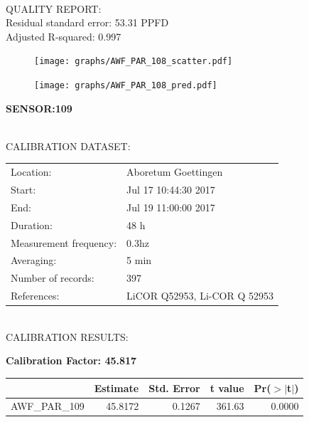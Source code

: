 \documentclass[oneside]{report}
\begin{document}
\hrulefill\\
QUALITY REPORT:\\
Residual standard error: 53.31 PPFD\\
Adjusted R-squared: 0.997



\begin{figure}[H]
  \centering
  \texttt{[image: graphs/AWF\_PAR\_108\_scatter.pdf]}
\end{figure}




\begin{figure}[H]
  \centering
  \texttt{[image: graphs/AWF\_PAR\_108\_pred.pdf]}
\end{figure}

\pagebreak


\begin{center}
\large{\textbf{SENSOR:109}}\\
\end{center}

\hrulefill\\
CALIBRATION DATASET:\\
\begin{table}[h!]
  \centering
  \label{tab:table1}
  \begin{tabular}{ll}
    Location: & Aboretum Goettingen\\ 
    
    
    Start:  & Jul 17 10:44:30 2017 \\
    End:   & Jul 19 11:00:00 2017\\ 
    Duration: & 48 h\\
    Measurement frequency: & 0.3hz\\
    Averaging:  &5 min\\
    Number of records: & 397 \\
    References: & LiCOR Q52953, Li-COR Q 52953 \\
  \end{tabular}
\end{table}

\hrulefill\\
CALIBRATION RESULTS:\\


\begin{center}
\textbf{\large{Calibration Factor: 45.817}}\\
\end{center}
\begin{table}[ht]
\centering
\begin{tabular}{rrrrr}
  \hline
 & Estimate & Std. Error & t value & Pr($>$$|$t$|$) \\ 
  \hline
AWF\_PAR\_109 & 45.8172 & 0.1267 & 361.63 & 0.0000 \\ 
   \hline
\end{tabular}
\end{table}
\end{document}
